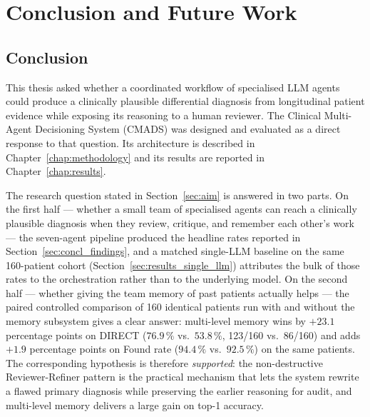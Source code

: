 \chapter{Conclusion and Future Work}
\label{chap:conclusion}

\section{Conclusion}
\label{sec:conclusion}

This thesis asked whether a coordinated workflow of specialised LLM
agents could produce a clinically plausible differential diagnosis from
longitudinal patient evidence while exposing its reasoning to a human
reviewer. The Clinical Multi-Agent Decisioning System (CMADS) was
designed and evaluated as a direct response to that question. Its
architecture is described in Chapter~\ref{chap:methodology} and its
results are reported in Chapter~\ref{chap:results}.

The research question stated in Section~\ref{sec:aim} is answered in two
parts. On the first half --- whether a small team of specialised agents
can reach a clinically plausible diagnosis when they review, critique, and
remember each other's work --- the seven-agent pipeline produced the
headline rates reported in Section~\ref{sec:concl_findings}, and a
matched single-LLM baseline on the same 160-patient cohort
(Section~\ref{sec:results_single_llm}) attributes the bulk of those
rates to the orchestration rather than to the underlying model. On the
second half --- whether giving the team memory of past patients
actually helps --- the paired controlled comparison of 160 identical
patients run with and without the memory subsystem gives a clear
answer: multi-level memory wins by $+23.1$ percentage points on
DIRECT ($76.9\,\%$ vs.\ $53.8\,\%$, 123/160 vs.\ 86/160) and adds
$+1.9$ percentage points on Found rate
($94.4\,\%$ vs.\ $92.5\,\%$) on the same patients. The corresponding
hypothesis is therefore \emph{supported}: the non-destructive
Reviewer-Refiner pattern is the practical mechanism that lets the
system rewrite a flawed primary diagnosis while preserving the
earlier reasoning for audit, and multi-level memory delivers a large
gain on top-1 accuracy.


